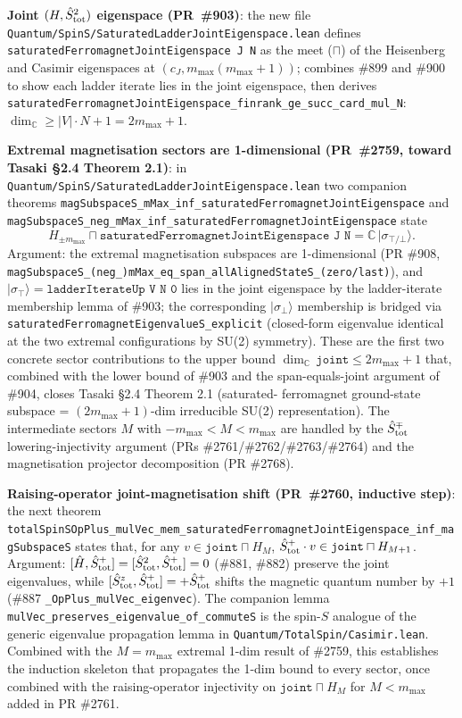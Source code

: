 \documentclass[a4paper,11pt]{article}
\begin{document}
\textbf{Joint $(H, \hat S_{\rm tot}^2)$ eigenspace (PR~\#903)}: the
new file \texttt{Quantum/SpinS/SaturatedLadderJointEigenspace.lean}
defines \texttt{saturatedFerromagnetJointEigenspace J N} as the
meet ($\sqcap$) of the Heisenberg and Casimir eigenspaces at
$(c_J, m_{\max}(m_{\max}+1))$; combines \#899 and \#900 to show
each ladder iterate lies in the joint eigenspace, then derives
\texttt{saturatedFerromagnetJointEigenspace\_finrank\_ge\_succ\_card\_mul\_N}:
$\dim_\mathbb{C} \geq |V|\cdot N + 1 = 2m_{\max} + 1$.

\textbf{Extremal magnetisation sectors are 1-dimensional (PR~\#2759,
toward Tasaki §2.4 Theorem 2.1)}: in
\texttt{Quantum/SpinS/SaturatedLadderJointEigenspace.lean} two
companion theorems
\texttt{magSubspaceS\_mMax\_inf\_saturatedFerromagnetJointEigenspace}
and \texttt{magSubspaceS\_neg\_mMax\_inf\_saturatedFerromagnetJointEigenspace}
state
\[
  H_{\pm m_{\max}} \sqcap
  \texttt{saturatedFerromagnetJointEigenspace J N} =
  \mathbb{C}\,|\sigma_{\top/\bot}\rangle.
\]
Argument: the extremal magnetisation subspaces are 1-dimensional
(PR \#908, \texttt{magSubspaceS\_(neg\_)mMax\_eq\_span\_allAlignedStateS\_(zero/last)}),
and $|\sigma_\top\rangle = \texttt{ladderIterateUp V N 0}$ lies in
the joint eigenspace by the ladder-iterate membership lemma of
\#903; the corresponding $|\sigma_\bot\rangle$ membership is bridged
via \texttt{saturatedFerromagnetEigenvalueS\_explicit} (closed-form
eigenvalue identical at the two extremal configurations by SU(2)
symmetry). These are the first two concrete sector contributions
to the upper bound $\dim_\mathbb{C}\,\texttt{joint} \le 2m_{\max}+1$
that, combined with the lower bound of \#903 and the span-equals-joint
argument of \#904, closes Tasaki §2.4 Theorem 2.1 (saturated-
ferromagnet ground-state subspace = $(2m_{\max}+1)$-dim irreducible
SU(2) representation). The intermediate sectors $M$ with
$-m_{\max} < M < m_{\max}$ are handled by the $\hat S^\mp_{\rm tot}$
lowering-injectivity argument (PRs \#2761/\#2762/\#2763/\#2764) and
the magnetisation projector decomposition (PR \#2768).

\textbf{Raising-operator joint-magnetisation shift (PR~\#2760,
inductive step)}: the next theorem
\texttt{totalSpinSOpPlus\_mulVec\_mem\_saturatedFerromagnetJointEigenspace\_inf\_magSubspaceS}
states that, for any
$v \in \texttt{joint} \sqcap H_M$,
$\hat S^+_{\rm tot} \cdot v \in \texttt{joint} \sqcap H_{M+1}$.
Argument: $[\hat H, \hat S^+_{\rm tot}] = [\hat S_{\rm tot}^2,
\hat S^+_{\rm tot}] = 0$ (\#881, \#882) preserve the joint
eigenvalues, while
$[\hat S^z_{\rm tot}, \hat S^+_{\rm tot}] = +\hat S^+_{\rm tot}$
shifts the magnetic quantum number by $+1$
(\#887 \texttt{\_OpPlus\_mulVec\_eigenvec}). The companion lemma
\texttt{mulVec\_preserves\_eigenvalue\_of\_commuteS} is the spin-$S$
analogue of the generic eigenvalue propagation lemma in
\texttt{Quantum/TotalSpin/Casimir.lean}. Combined with the
$M = m_{\max}$ extremal 1-dim result of \#2759, this establishes the
induction skeleton that propagates the 1-dim bound to every sector,
once combined with the raising-operator injectivity on
$\texttt{joint} \sqcap H_{M}$ for $M < m_{\max}$ added in PR \#2761.
\end{document}
